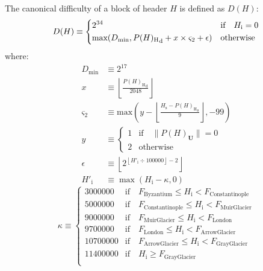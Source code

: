 \documentclass[9pt,oneside]{amsart}
\makeatletter
\newcommand{\linkdest}[1]{\Hy@raisedlink{\hypertarget{#1}{}}}
\makeatother
\begin{document}
\begin{multicols}{2}
\newcommand{\mindifficulty}{D_\mathrm{min}}
\newcommand{\homesteadmod}{\ensuremath{\varsigma_2}}
\newcommand{\expdiffsymb}{\ensuremath{\epsilon}}
\newcommand{\diffadjustment}{x}

\hypertarget{block_difficulty_H__d}{}\linkdest{H__d}The canonical difficulty of a block of header $H$ is defined as $D(H)$:
\begin{equation}
D(H) \equiv \begin{dcases}
2^{34} & \text{if} \quad H_{\mathrm{i}} = 0\\
\text{max}\!\left(\mindifficulty, {P(H)_{\mathrm{H}}}_{\mathrm{d}} + \diffadjustment\times\homesteadmod + \expdiffsymb \right) & \text{otherwise}\\
\end{dcases}
\end{equation}
where:
\begin{align}
\mindifficulty &\equiv 2^{17} \\
\diffadjustment &\equiv \left\lfloor\frac{{P(H)_{\mathrm{H}}}_{\mathrm{d}}}{2048}\right\rfloor \\
\homesteadmod &\equiv \text{max}\left( y - \left\lfloor\frac{H_{\mathrm{s}} - {P(H)_{\mathrm{H}}}_{\mathrm{s}}}{9}\right\rfloor, -99 \right) \\
y &\equiv \begin{cases}
1 & \text{if} \quad \lVert P(H)_{\mathbf{U}}\rVert = 0 \\
2 & \text{otherwise}
\end{cases} \\
\expdiffsymb &\equiv \left\lfloor 2^{ \left\lfloor H'_{\mathrm{i}} \div 100000 \right\rfloor - 2 } \right\rfloor \\
H'_{\mathrm{i}} &\equiv \max(H_{\mathrm{i}} - \kappa, 0)
\end{align}
\begin{equation}
\kappa \equiv \begin{cases} 
  3000000  & \text{if} \quad F_{\mathrm{Byzantium}} \leqslant H_{\mathrm{i}} < F_{\mathrm{Constantinople}} \\
  5000000  & \text{if} \quad F_{\mathrm{Constantinople}} \leqslant H_{\mathrm{i}} < F_{\mathrm{Muir Glacier}} \\
  9000000  & \text{if} \quad F_{\mathrm{Muir Glacier}} \leqslant H_{\mathrm{i}} < F_{\mathrm{London}} \\
  9700000  & \text{if} \quad F_{\mathrm{London}} \leqslant H_{\mathrm{i}} < F_{\mathrm{Arrow Glacier}} \\
 10700000  & \text{if} \quad F_{\mathrm{Arrow Glacier}} \leqslant H_{\mathrm{i}} < F_{\mathrm{Gray Glacier}} \\
 11400000  & \text{if} \quad H_{\mathrm{i}} \geqslant F_{\mathrm{Gray Glacier}} \\
\end{cases}
\end{equation}


\end{multicols}
\end{document}
